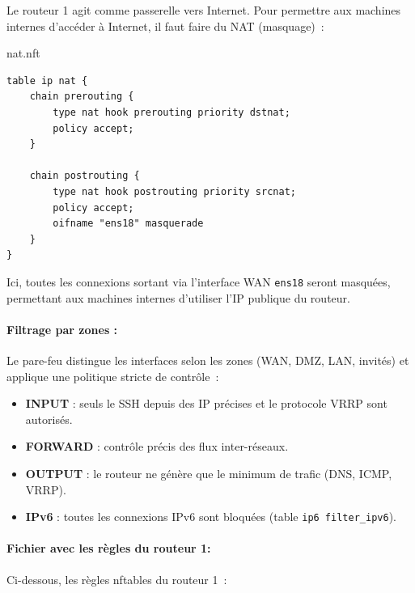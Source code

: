 \documentclass{article}
\begin{document}
Le routeur 1 agit comme passerelle vers Internet. Pour permettre aux machines internes d'accéder à Internet, il faut faire du NAT (masquage)~:

\begin{configbox}{nat.nft}
\begin{lstlisting}
table ip nat {
    chain prerouting {
        type nat hook prerouting priority dstnat;
        policy accept;
    }

    chain postrouting {
        type nat hook postrouting priority srcnat;
        policy accept;
        oifname "ens18" masquerade
    }
}
\end{lstlisting}
\end{configbox}

Ici, toutes les connexions sortant via l'interface WAN \texttt{ens18} seront masquées, permettant aux machines internes d’utiliser l’IP publique du routeur.

\paragraph{Filtrage par zones :}

Le pare-feu distingue les interfaces selon les zones (WAN, DMZ, LAN, invités) et applique une politique stricte de contrôle~:

\begin{itemize}
    \item \textbf{INPUT} : seuls le SSH depuis des IP précises et le protocole VRRP sont autorisés.
    \item \textbf{FORWARD} : contrôle précis des flux inter-réseaux.
    \item \textbf{OUTPUT} : le routeur ne génère que le minimum de trafic (DNS, ICMP, VRRP).
    \item \textbf{IPv6} : toutes les connexions IPv6 sont bloquées (table \texttt{ip6 filter\_ipv6}).
\end{itemize}

\paragraph{Fichier avec les règles du routeur 1:}

Ci-dessous, les règles nftables du routeur 1~:
\end{document}
